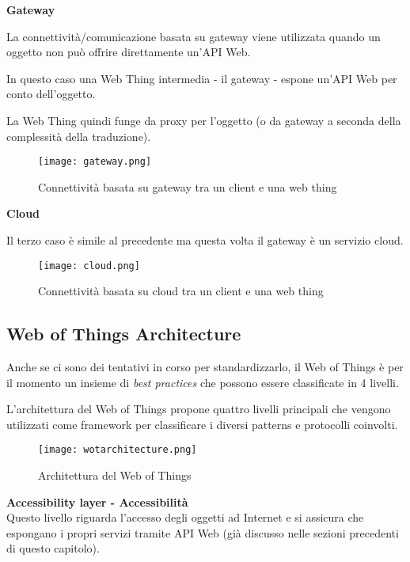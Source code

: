 \textbf{Gateway}

La connettività/comunicazione basata su gateway viene utilizzata quando un oggetto
non può offrire direttamente un'API Web.

In questo caso una Web Thing intermedia - il gateway - espone un'API Web
per conto dell'oggetto.

La Web Thing quindi funge da proxy per l'oggetto (o da gateway a seconda della
complessità della traduzione).

\begin{figure}[H]
  \centering
  \texttt{[image: gateway.png]}
  \caption{Connettività basata su gateway tra un client e una web thing}
  \label{fig:gateway}
\end{figure}

\textbf{Cloud}

Il terzo caso è simile al precedente ma questa volta il gateway è un servizio
cloud.

\begin{figure}[H]
  \centering
  \texttt{[image: cloud.png]}
  \caption{Connettività basata su cloud tra un client e una web thing}
  \label{fig:cloud}
\end{figure}

\subsection{Web of Things Architecture}

Anche se ci sono dei tentativi in corso per standardizzarlo, il Web of Things
è per il momento un insieme di \textit{best practices} che possono essere
classificate in 4 livelli.

L'architettura del Web of Things propone quattro livelli principali che vengono
utilizzati come framework per classificare i diversi patterns e protocolli
coinvolti.

\begin{figure}[H]
  \centering
  \texttt{[image: wotarchitecture.png]}
  \caption{Architettura del Web of Things}
  \label{fig:wotarchitecture}
\end{figure}

\textbf{Accessibility layer - Accessibilità}\\

Questo livello riguarda l'accesso degli oggetti ad
Internet e si assicura che espongano i propri servizi tramite API Web
(già discusso nelle sezioni precedenti di questo capitolo). \\

